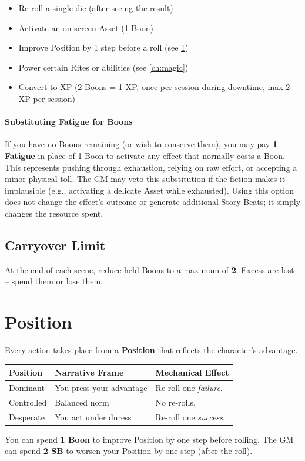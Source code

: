 \begin{itemize}
  \item Re-roll a single die (after seeing the result)
  \item Activate an on-screen Asset (1 Boon)
  \item Improve Position by 1 step before a roll (see \ref{sec:position})
  \item Power certain Rites or abilities (see \ref{ch:magic})
  \item Convert to XP (2 Boons = 1 XP, once per session during downtime, max 2 XP per session)
\end{itemize}

\paragraph{Substituting Fatigue for Boons}
If you have no Boons remaining (or wish to conserve them), you may pay \textbf{1 Fatigue} in place of 1 Boon to activate any effect that normally costs a Boon. This represents pushing through exhaustion, relying on raw effort, or accepting a minor physical toll. The GM may veto this substitution if the fiction makes it implausible (e.g., activating a delicate Asset while exhausted). Using this option does not change the effect's outcome or generate additional Story Beats; it simply changes the resource spent.

\subsection{Carryover Limit}
\label{sec:boon-carryover}
At the end of each scene, reduce held Boons to a maximum of \textbf{2}. Excess are lost -- spend them or lose them.

\section{Position}
\label{sec:position}

Every action takes place from a \textbf{Position} that reflects the character's advantage.

\begin{tcolorbox}[colback=white!97!gray,colframe=black!80!gray,title=\textbf{Position Effects},breakable]
  \begin{tabularx}{\textwidth}{lXX}
  \toprule
  \textbf{Position} & \textbf{Narrative Frame} & \textbf{Mechanical Effect} \\
  \midrule
  Dominant & You press your advantage & Re-roll one \textit{failure}. \\
  Controlled & Balanced norm & No re-rolls. \\
  Desperate & You act under duress & Re-roll one \textit{success}. \\
  \bottomrule
  \end{tabularx}
  \smallskip
  \noindent You can spend \textbf{1 Boon} to improve Position by one step before rolling.  
  The GM can spend \textbf{2 SB} to worsen your Position by one step (after the roll).
  \end{tcolorbox}

